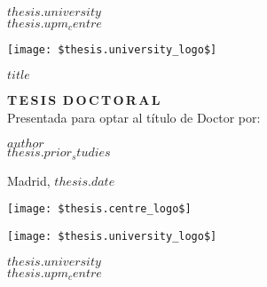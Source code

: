 \begin{center}
\begin{spacing}{1.3}
    \textbf{\large {$thesis.university$}}\\
    \textbf{\large {$thesis.upm_centre$}}\\
    \vspace{5mm}
\end{spacing}
    \texttt{[image: \$thesis.university\_logo\$]}

\begin{spacing}{2.0}
\textbf{\LARGE {$title$}}
\end{spacing}

\vspace{15 mm}

\begin{spacing}{1.3}
\textbf{\LARGE {T\,E\,S\,I\,S\, D\,O\,C\,T\,O\,R\,A\,L}}\\
\medskip
{\large {Presentada para optar al título de Doctor por:}}
\end{spacing}
\end{center}


\begin{center}
\begin{spacing}{1.3}
\textbf{\Large {$author$}}\\
{\large {$thesis.prior_studies$}}\\
\end{spacing}
\end{center}

\vspace{\fill}

\begin{center}
    \large {Madrid, $thesis.date$}
\end{center}

\newpage



\begin{minipage}{0.20\textwidth}
        \texttt{[image: \$thesis.centre\_logo\$]}   
\end{minipage}
\begin{minipage}{0.20\textwidth}
        \texttt{[image: \$thesis.university\_logo\$]}
\end{minipage}
\begin{minipage}{0.65\textwidth} \centering
    {$thesis.university$}\\
    {$thesis.upm_centre$}\\
\end{minipage}

